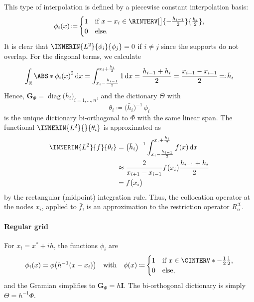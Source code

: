 \documentclass[a4paper]{paper}
\newcommand*{\SPC}[1]{{\ensuremath{\mathscr{#1}}}}
\newcommand{\RR}{{\ensuremath{\mathbb{R}}}}
\newcommand*{\REST}[2]{\ensuremath{R_{#1}^{#2}}}
\newcommand*{\RnX}{{\ensuremath{\REST{n}{\SPC{X}}}}}
\DeclareMathOperator{\DIAG}{{diag}}
\DeclareMathOperator{\DEFEQ}{{\coloneqq}}
\DeclareMathOperator{\EQDEF}{{\eqqcolon}}
\newcommand*{\D}{{\ensuremath{\mathrm{d}}}}
\newcommand*{\BDG}{\boldsymbol{G}}
\newcommand*{\BDI}{\boldsymbol{I}}
\begin{document}
This type of interpolation is defined by a piecewise constant interpolation basis:
%
\begin{equation*}
 \phi_i(x) \DEFEQ 
 \begin{cases}
  1 & \text{if } x - x_i \in \RINTERV[\big]{- \tfrac{h_{i-1}}{2}}{\frac{h_i}{2}}, \\
  0 & \text{else}.
 \end{cases}
\end{equation*}
%
It is clear that $\INNERIN{L^2}{\phi_i}{\phi_j} = 0$ if $i \neq j$ since the supports do not overlap. For 
the diagonal terms, we calculate
%
\begin{equation*}
 \int_\RR \ABS*{\phi_i(x)}^2\, \D x 
 = \int_{x_i - \frac{h_{i-1}}{2}}^{x_i + \frac{h_i}{2}} 1\, \D x
 = \frac{h_{i-1} + h_i}{2} = \frac{x_{i+1} - x_{i-1}}{2}
 \EQDEF \bar h_i
\end{equation*}
%
Hence, $\BDG_\Phi = \DIAG\big( \bar h_i \big)_{i=1,\dots,n}$, and the dictionary $\Theta$ with
%
\begin{equation*}
 \theta_i \DEFEQ \big( \bar h_i \big)^{-1}\, \phi_i
\end{equation*}
%
is the unique dictionary bi-orthogonal to $\Phi$ with the same linear span. The functional 
$\INNERIN{L^2}{}{\theta_i}$ is approximated as
%
\begin{align*}
 \INNERIN{L^2}{f}{\theta_i}
 &= \big( \bar h_i \big)^{-1} \int_{x_i - \frac{h_{i-1}}{2}}^{x_i + 
 \frac{h_i}{2}} f(x)\, \D x \\
 &\approx  \frac{2}{x_{i+1} - x_{i-1}} f\big( x_i \big) \frac{h_{i-1} + h_i}{2} 
 \\
 &= f\big( x_i \big)
\end{align*}
%
by the rectangular (midpoint) integration rule. Thus, the collocation operator at the nodes $x_i$, applied to 
$\bar f$, is an approximation to the restriction operator $\RnX$.

\paragraph{Regular grid}

For $x_i = x^* + i h$, the functions $\phi_i$ are
%
\begin{equation*}
 \phi_i(x) = \phi\big( h^{-1}(x-x_i) \big)
 \quad \text{with} \quad
 \phi(x) \DEFEQ
 \begin{cases}
  1 & \text{if } x \in \CINTERV*{-\tfrac{1}{2}}{\tfrac{1}{2}}, \\
  0 & \text{else},
 \end{cases}
\end{equation*}
%
and the Gramian simplifies to $\BDG_\Phi = h \BDI$. The bi-orthogonal dictionary is simply $\Theta = h^{-1}\Phi$.
\end{document}
